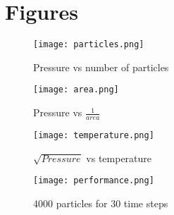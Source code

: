 \documentclass[a4paper, 12pt]{article}
\begin{document}
\section{Figures}
\label{sec:fig}
\begin{figure}[hb]
        \centering
        \texttt{[image: particles.png]}
        \caption{Pressure vs number of particles}
        \label{fig:n}
\end{figure}
\begin{figure}[hb]
        \centering
        \texttt{[image: area.png]}
        \caption{Pressure vs $\frac{1}{area}$}
        \label{fig:V}
\end{figure}
\begin{figure}[hb]
        \centering
        \texttt{[image: temperature.png]}
        \caption{$\sqrt{Pressure}$ vs temperature}
        \label{fig:T}
\end{figure}
\begin{figure}[h]
        \centering
        \texttt{[image: performance.png]}
        \caption{4000 particles for 30 time steps}
        \label{fig:perf}
\end{figure}
\end{document}
